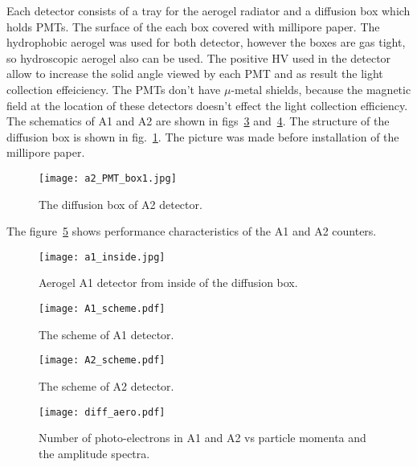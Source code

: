 Each detector consists of a tray for the aerogel radiator and a diffusion box
which holds PMTs. The surface of the each box covered with millipore
paper. The hydrophobic aerogel was used for both detector, however the boxes
are gas tight, so hydroscopic aerogel also can be used. The positive HV 
used in the detector allow to increase the solid angle viewed by each PMT
and as result the light collection effeiciency. The PMTs don't have
$\mu$-metal shields, because the magnetic field at the location of these
detectors  doesn't effect the light collection efficiency.
The schematics of A1 and A2 are shown in figs~\ref{fig:A1_scheme} 
and~\ref{fig:A2_scheme}.
The structure of the diffusion box is shown in fig.~\ref{fig:A2_PMT}.
The picture was made before installation of the millipore paper.
%
\begin{figure}[p]
\texttt{[image: a2\_PMT\_box1.jpg]}
\caption[The diffusion box of A2 detector]
{The diffusion box of A2 detector.}
\label{fig:A2_PMT}
\end{figure}
%

The figure~\ref{fig:diff_performance} shows performance characteristics 
of the A1 and A2 counters. 
%
\begin{figure}[p]
\texttt{[image: a1\_inside.jpg]}
\caption[Aerogel A1 from inside of the detector ]
{Aerogel A1 detector from inside of the diffusion box. }
\label{fig:A1_inside}
\end{figure}
%
\begin{figure}[p]
\texttt{[image: A1\_scheme.pdf]}
\caption[The scheme of A1 detector] {The scheme of A1 detector.}
\label{fig:A1_scheme}
\end{figure}
%
\begin{figure}[p]
\texttt{[image: A2\_scheme.pdf]}
\caption[The scheme of A2 detector] {The scheme of A2 detector.}
\label{fig:A2_scheme}
\end{figure}
%
\begin{figure}[p]
\texttt{[image: diff\_aero.pdf]}
\caption[Number of photo-electrons in A1 and A2 vs particle momenta and 
the amplitude spectra]
{Number of photo-electrons in A1 and A2 vs particle momenta and 
the amplitude spectra.}
\label{fig:diff_performance}
\end{figure}



